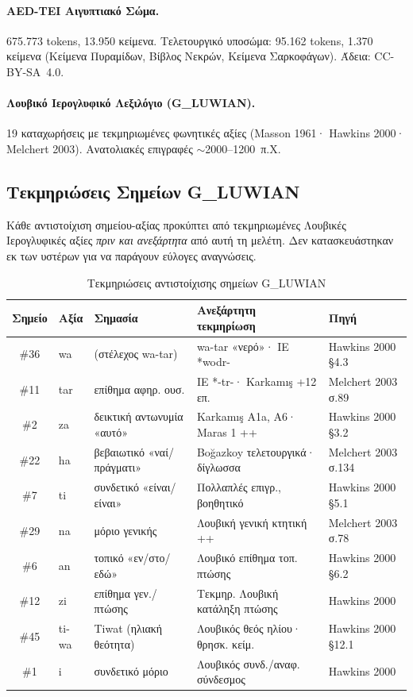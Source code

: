 \documentclass[12pt,a4paper]{article}
\begin{document}
\paragraph{AED-TEI Αιγυπτιακό Σώμα.}
675.773 tokens, 13.950 κείμενα. Τελετουργικό υποσώμα: 95.162 tokens, 1.370 κείμενα (Κείμενα Πυραμίδων, Βίβλος Νεκρών, Κείμενα Σαρκοφάγων). Άδεια: CC-BY-SA~4.0.

\paragraph{Λουβικό Ιερογλυφικό Λεξιλόγιο (G\_LUWIAN).}
19 καταχωρήσεις με τεκμηριωμένες φωνητικές αξίες (Masson 1961· Hawkins 2000· Melchert 2003). Ανατολιακές επιγραφές $\sim$2000--1200~π.Χ.

\subsection{Τεκμηριώσεις Σημείων G\_LUWIAN}

Κάθε αντιστοίχιση σημείου-αξίας προκύπτει από τεκμηριωμένες Λουβικές Ιερογλυφικές αξίες \emph{πριν και ανεξάρτητα} από αυτή τη μελέτη. Δεν κατασκευάστηκαν εκ των υστέρων για να παράγουν εύλογες αναγνώσεις.

\begin{table}[h]
\centering
\caption{Τεκμηριώσεις αντιστοίχισης σημείων G\_LUWIAN}
\small
\begin{tabular}{clp{3.5cm}p{3.5cm}l}
\toprule
\textbf{Σημείο} & \textbf{Αξία} & \textbf{Σημασία} & \textbf{Ανεξάρτητη τεκμηρίωση} & \textbf{Πηγή} \\
\midrule
\#36 & wa   & (στέλεχος wa-tar)          & wa-tar «νερό»· ΙΕ *wodr-         & Hawkins 2000 §4.3 \\
\#11 & tar  & επίθημα αφηρ. ουσ.         & ΙΕ *-tr-· Karkamış +12 επ.      & Melchert 2003 σ.89 \\
\#2  & za   & δεικτική αντωνυμία «αυτό»  & Karkamış A1a, A6· Maras 1 ++     & Hawkins 2000 §3.2 \\
\#22 & ha   & βεβαιωτικό «ναί/πράγματι» & Boğazkoy τελετουργικά· δίγλωσσα  & Melchert 2003 σ.134 \\
\#7  & ti   & συνδετικό «είναι/είναι»   & Πολλαπλές επιγρ., βοηθητικό      & Hawkins 2000 §5.1 \\
\#29 & na   & μόριο γενικής              & Λουβική γενική κτητική ++         & Melchert 2003 σ.78 \\
\#6  & an   & τοπικό «εν/στο/εδώ»        & Λουβικό επίθημα τοπ. πτώσης      & Hawkins 2000 §6.2 \\
\#12 & zi   & επίθημα γεν./πτώσης        & Τεκμηρ. Λουβική κατάληξη πτώσης  & Hawkins 2000 \\
\#45 & ti-wa & Tiwat (ηλιακή θεότητα)   & Λουβικός θεός ηλίου· θρησκ. κείμ. & Hawkins 2000 §12.1 \\
\#1  & i    & συνδετικό μόριο            & Λουβικός συνδ./αναφ. σύνδεσμος   & Hawkins 2000 \\
\bottomrule
\end{tabular}
\end{table}
\end{document}
